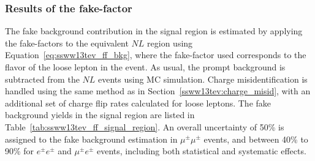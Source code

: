 

%
\subsubsection{Results of the fake-factor}\label{ssww13tev:ff_results}
The fake background contribution in the signal region is estimated by applying the fake-factors to the equivalent $NL$ region using Equation~\ref{eq:ssww13tev_ff_bkg}, where the fake-factor used corresponds to the flavor of the loose lepton in the event.
As usual, the prompt background is subtracted from the $NL$ events using MC simulation.
Charge misidentification is handled using the same method as in Section~\ref{ssww13tev:charge_misid}, with an additional set of charge flip rates calculated for loose leptons.
The fake background yields in the signal region are listed in Table~\ref{tab:ssww13tev_ff_signal_region}.
An overall uncertainty of 50\% is assigned to the fake background estimation in $\mu^{\pm}\mu^{\pm}$ events, and between 40\% to 90\% for $e^{\pm}e^{\pm}$ and $\mu^{\pm}e^{\pm}$ events, including both statistical and systematic effects.

\begin{table}[hbtp]
\centering
\caption{Estimated yields for the fake lepton background. The estimated yield is shown in the first column together with the statistical uncertainty followed by the systematic uncertainties from variations of the the fake-factors within their statistical (stat.) and systematic (syst.) uncertainties. The labels $f_e$ and $f_\mu$ indicate the fake-factors for electrons and muons, respectively.}
  \label{tab:ssww13tev_ff_signal_region}
\end{table}

